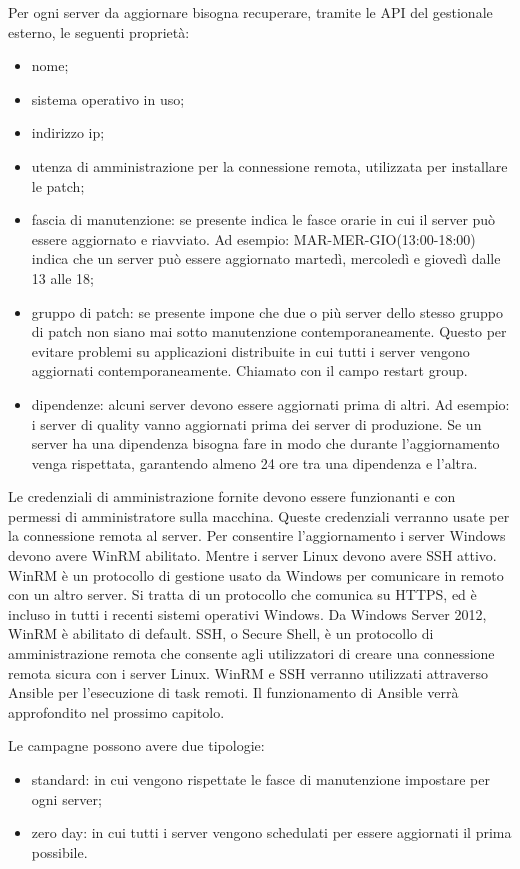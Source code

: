Per ogni server da aggiornare bisogna recuperare, tramite le API del gestionale 
esterno, le seguenti proprietà:
\begin{itemize}
\item nome;
\item sistema operativo in uso;
\item indirizzo ip;
\item utenza di amministrazione per la connessione remota, utilizzata per 
installare le patch;
\item fascia di manutenzione: se presente indica le fasce orarie in cui il
server può essere aggiornato e riavviato. Ad esempio: MAR-MER-GIO(13:00-18:00)
indica che un server può essere aggiornato martedì, mercoledì e 
giovedì dalle 13 alle 18;
\item gruppo di patch: se presente impone che due o più server dello
stesso gruppo di patch non siano mai sotto manutenzione contemporaneamente. 
Questo per evitare problemi su applicazioni distribuite in cui tutti i server 
vengono aggiornati contemporaneamente. Chiamato con il campo restart group.
\item dipendenze: alcuni server devono essere aggiornati prima di altri. 
Ad esempio: i server di quality vanno aggiornati prima dei server di produzione.
Se un server ha una dipendenza bisogna fare in modo che durante l’aggiornamento
venga rispettata, garantendo almeno 24 ore tra una dipendenza e l’altra.
\end{itemize}
Le credenziali di amministrazione fornite devono essere funzionanti e con 
permessi di amministratore sulla macchina. Queste credenziali verranno usate
per la connessione remota al server.
Per consentire l’aggiornamento i server Windows devono avere WinRM abilitato.
Mentre i server Linux devono avere SSH attivo. WinRM è un protocollo di 
gestione usato da Windows per comunicare in remoto con un altro server. 
Si tratta di un protocollo che comunica su HTTPS, ed è incluso in tutti 
i recenti sistemi operativi Windows. Da Windows Server 2012, WinRM è 
abilitato di default. 
SSH, o Secure Shell, è un protocollo di amministrazione remota che consente 
agli utilizzatori di creare una connessione remota sicura con i server Linux.
WinRM e SSH verranno utilizzati attraverso Ansible per l’esecuzione di task
remoti. Il funzionamento di Ansible verrà approfondito nel prossimo capitolo.

Le campagne possono avere due tipologie:
\begin{itemize}
\item standard: in cui vengono rispettate le fasce di manutenzione impostare 
per ogni server;
\item zero day: in cui tutti i server vengono schedulati per essere 
aggiornati il prima possibile.
\end{itemize}


